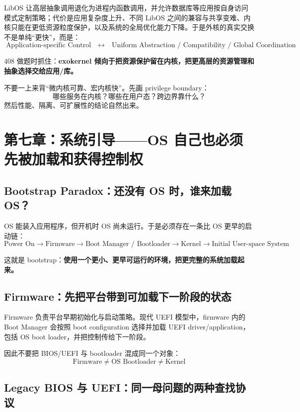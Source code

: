 \documentclass[11pt,a4paper]{ctexart}
\newcommand{\kw}[1]{\textbf{#1}}
\begin{document}
LibOS 让高层抽象调用退化为进程内函数调用，并允许数据库等应用按自身访问模式定制策略；代价是应用复杂度上升、不同 LibOS 之间的兼容与共享变难、内核只能在更低资源粒度保护，以及系统的全局优化能力下降。于是外核的真实交换不是单纯“更快”，而是：
\[
\boxed{\text{Application-specific Control}}
\quad\leftrightarrow\quad
\boxed{\text{Uniform Abstraction / Compatibility / Global Coordination}}
\]

408 做题时抓住：\kw{exokernel 倾向于把资源保护留在内核，把更高层的资源管理和抽象选择交给应用/库。}

\begin{exam}[结构题第一动作]
不要一上来背“微内核可靠、宏内核快”。先画 privilege boundary：
\[
\boxed{\text{哪些服务在内核？哪些在用户态？跨边界靠什么？}}
\]
然后性能、隔离、可扩展性的结论自然出来。
\end{exam}

\section{第七章：系统引导——OS 自己也必须先被加载和获得控制权}

\subsection{Bootstrap Paradox：还没有 OS 时，谁来加载 OS？}

OS 能装入应用程序，但开机时 OS 尚未运行。于是必须存在一条比 OS 更早的启动链：
\[
\boxed{
\text{Power On}
\rightarrow
\text{Firmware}
\rightarrow
\text{Boot Manager / Bootloader}
\rightarrow
\text{Kernel}
\rightarrow
\text{Initial User-space System}
}
\]

这就是 bootstrap：\kw{使用一个更小、更早可运行的环境，把更完整的系统加载起来。}

\subsection{Firmware：先把平台带到可加载下一阶段的状态}

Firmware 负责平台早期初始化与启动策略。现代 UEFI 模型中，firmware 内的 Boot Manager 会按照 boot configuration 选择并加载 UEFI driver/application，包括 OS boot loader，并把控制传给下一阶段。

因此不要把 BIOS/UEFI 与 bootloader 混成同一个对象：
\[
\boxed{\text{Firmware}\neq\text{OS Bootloader}\neq\text{Kernel}}
\]

\subsection{Legacy BIOS 与 UEFI：同一母问题的两种查找协议}
\end{document}
